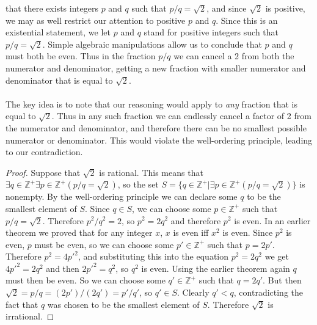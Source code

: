 \documentclass{report}
\theoremstyle{definition}
\begin{document}
that there exists integers $p$ and $q$ such that $p/q=\sqrt2$, and since $\sqrt2$ is positive, we may as well restrict our attention to positive $p$ and $q$. 
Since this is an existential statement, we let $p$ and $q$ stand for positive integers such that $p/q=\sqrt2$. Simple algebraic manipulations allow us to conclude that $p$ and $q$ must both be even.
Thus in the fraction $p/q$ we can cancel a 2 from both the numerator and denominator, getting a new fraction with smaller numerator and denominator that is equal to $\sqrt2$.\\
\vspace{1mm}\\
The key idea is to note that our reasoning would apply to \textit{any} fraction that is equal to $\sqrt2$. Thus in any such fraction we can endlessly cancel a factor of 2 from the numerator and 
denominator, and therefore there can be no smallest possible numerator or denominator. This would
violate the well-ordering principle, leading to our contradiction.
\begin{proof}
Suppose that $\sqrt2$ is rational. This means that $\exists q\in\mathbb Z^+\exists p\in\mathbb Z^+(p/q=\sqrt2)$, so the set $S=\{q\in\mathbb Z^+|\exists p\in\mathbb Z^+(p/q=\sqrt2)\}$ is nonempty.
By the well-ordering principle we can declare some $q$ to be the smallest element of $S$.
Since $q\in S$, we can choose some $p\in\mathbb Z^+$ such that $p/q=\sqrt2$. Therefore $p^2/q^2=2$, so $p^2=2q^2$ and therefore $p^2$ is even. In an earlier theorem
we proved that for any integer $x$, $x$ is even iff $x^2$ is even. Since $p^2$ is even, $p$ must be even, so we can choose some $p'\in\mathbb Z^+$ such that $p=2p'$.
Therefore $p^2=4p'^2$, and substituting this into the equation $p^2=2q^2$ we get $4p'^2=2q^2$ and then $2p'^2=q^2$, so $q^2$ is even. Using the earlier theorem again $q$ must then be even. So we
can choose some $q'\in\mathbb Z^+$ such that $q=2q'$. But then $\sqrt2=p/q=(2p')/(2q')=p'/q'$, so
$q'\in S$. Clearly $q'<q$, contradicting the fact that $q$ was chosen to be the smallest element of $S$. Therefore $\sqrt2$ is irrational.
\end{proof}
\newpage
\end{document}
